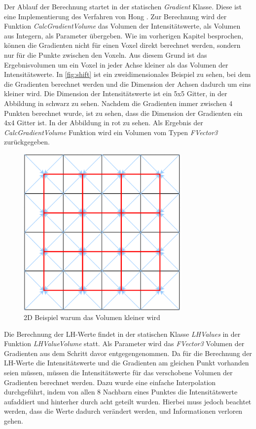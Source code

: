 Der Ablauf der Berechnung startet in der statischen \textit{Gradient} Klasse. Diese ist eine Implementierung des Verfahren von Hong \cite{hong2003method}. Zur Berechnung wird der Funktion \textit{CalcGradientVolume} das Volumen der Intensitätswerte, als Volumen aus Integern, als Parameter übergeben. Wie im vorherigen Kapitel besprochen, können die Gradienten nicht für einen Voxel direkt berechnet werden, sondern nur für die Punkte zwischen den Voxeln. Aus diesem Grund ist das Ergebnisvolumen um ein Voxel in jeder Achse kleiner als das Volumen der Intensitätswerte. In \autoref{fig:shift} ist ein zweidimensionales Beispiel zu sehen, bei dem die Gradienten berechnet werden und die Dimension der Achsen dadurch um eins kleiner wird. Die Dimension der Intensitätswerte ist ein 5x5 Gitter, in der Abbildung in schwarz zu sehen. Nachdem die Gradienten immer zwischen 4 Punkten berechnet wurde, ist zu sehen, dass die Dimension der Gradienten ein 4x4 Gitter ist. In der Abbildung in rot zu sehen. Als Ergebnis der  \textit{CalcGradientVolume} Funktion wird ein Volumen vom Typen \textit{FVector3} zurückgegeben.


\begin{figure}
\centering 
\includegraphics[width=0.75\textwidth]{Logos/VoxelShift.png}
\caption{2D Beispiel warum das Volumen kleiner wird} 
\label{fig:shift} 
\end{figure}



Die Berechnung der LH-Werte findet in der statischen Klasse \textit{LHValues} in der Funktion \textit{LHValueVolume} statt. Als Parameter wird das \textit{FVector3} Volumen der Gradienten aus dem Schritt davor entgegengenommen. Da für die Berechnung der LH-Werte die Intensitätswerte und die Gradienten am gleichen Punkt vorhanden seien müssen, müssen die Intensitätswerte für das verschobene Volumen der Gradienten berechnet werden. Dazu wurde eine einfache Interpolation durchgeführt, indem von allen 8 Nachbarn eines Punktes die Intensitätswerte aufaddiert und hinterher durch acht geteilt wurden. Hierbei muss jedoch beachtet werden, dass die Werte dadurch verändert werden, und Informationen verloren gehen.


